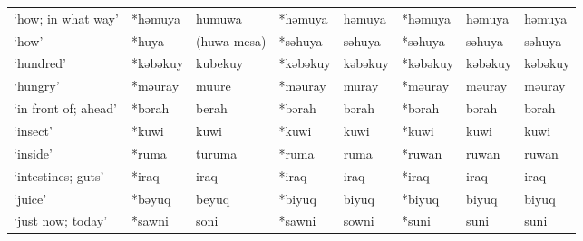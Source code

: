 \begin{landscape}
\begin{longtable}[c]{@{}p{3cm}<{\raggedright}p{2.75cm}<{\raggedright}p{2.75cm}<{\raggedright}p{2.75cm}<{\raggedright}p{2.75cm}<{\raggedright}p{2.75cm}<{\raggedright}p{2.75cm}<{\raggedright}p{2.75cm}<{\raggedright}@{}}
`how; in what way'                                   & *həmuya      & humuwa                        & *həmuya        & həmuya                     & *həmuya          & həmuya                   & həmuya                            \\
`how'                                                & *huya        & (huwa mesa)                   & *səhuya        & səhuya                     & *səhuya          & səhuya                   & səhuya                            \\
`hundred'                                            & *kəbəkuy     & kubekuy                       & *kəbəkuy       & kəbəkuy                    & *kəbəkuy         & kəbəkuy                  & kəbəkuy                           \\
`hungry'                                             & *məuray      & muure                         & *məuray        & muray                      & *məuray          & məuray                   & məuray                            \\
`in front of; ahead'                                 & *bərah       & berah                         & *bərah         & bərah                      & *bərah           & bərah                    & bərah                             \\
`insect'                                             & *kuwi        & kuwi                          & *kuwi          & kuwi                       & *kuwi            & kuwi                     & kuwi                              \\
`inside'                                             & *ruma        & turuma                        & *ruma          & ruma                       & *ruwan           & ruwan                    & ruwan                             \\
`intestines; guts'                                   & *iraq        & iraq                          & *iraq          & iraq                       & *iraq            & iraq                     & iraq                              \\
`juice'                                              & *bəyuq       & beyuq                         & *biyuq         & biyuq                      & *biyuq           & biyuq                    & biyuq                             \\
`just now; today'                                    & *sawni       & soni                          & *sawni         & sowni                      & *suni            & suni                     & suni                              \\

\end{longtable}
\end{landscape}
